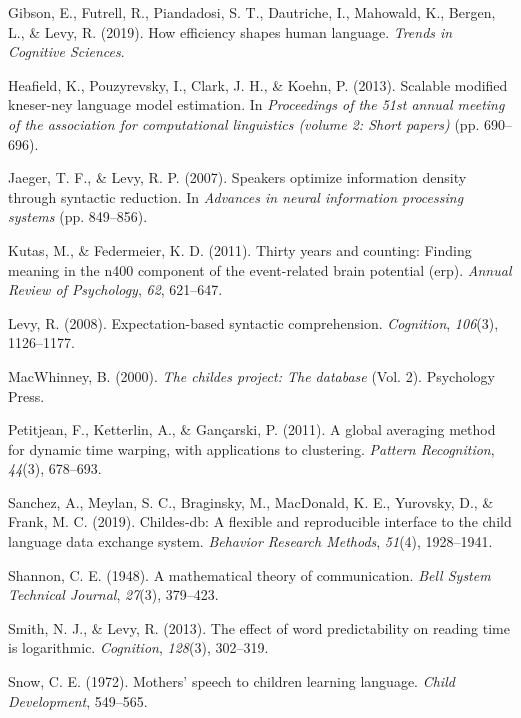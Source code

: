 \documentclass[10pt, letterpaper]{article}
\begin{document}
\leavevmode\hypertarget{ref-gibson2019}{}%
Gibson, E., Futrell, R., Piandadosi, S. T., Dautriche, I., Mahowald, K.,
Bergen, L., \& Levy, R. (2019). How efficiency shapes human language.
\emph{Trends in Cognitive Sciences}.

\leavevmode\hypertarget{ref-heafield2013}{}%
Heafield, K., Pouzyrevsky, I., Clark, J. H., \& Koehn, P. (2013).
Scalable modified kneser-ney language model estimation. In
\emph{Proceedings of the 51st annual meeting of the association for
computational linguistics (volume 2: Short papers)} (pp. 690--696).

\leavevmode\hypertarget{ref-jaeger2007}{}%
Jaeger, T. F., \& Levy, R. P. (2007). Speakers optimize information
density through syntactic reduction. In \emph{Advances in neural
information processing systems} (pp. 849--856).

\leavevmode\hypertarget{ref-kutas2011}{}%
Kutas, M., \& Federmeier, K. D. (2011). Thirty years and counting:
Finding meaning in the n400 component of the event-related brain
potential (erp). \emph{Annual Review of Psychology}, \emph{62},
621--647.

\leavevmode\hypertarget{ref-levy2008}{}%
Levy, R. (2008). Expectation-based syntactic comprehension.
\emph{Cognition}, \emph{106}(3), 1126--1177.

\leavevmode\hypertarget{ref-macwhinney2000}{}%
MacWhinney, B. (2000). \emph{The childes project: The database} (Vol.
2). Psychology Press.

\leavevmode\hypertarget{ref-petitjean2011}{}%
Petitjean, F., Ketterlin, A., \& Gançarski, P. (2011). A global
averaging method for dynamic time warping, with applications to
clustering. \emph{Pattern Recognition}, \emph{44}(3), 678--693.

\leavevmode\hypertarget{ref-sanchez2019}{}%
Sanchez, A., Meylan, S. C., Braginsky, M., MacDonald, K. E., Yurovsky,
D., \& Frank, M. C. (2019). Childes-db: A flexible and reproducible
interface to the child language data exchange system. \emph{Behavior
Research Methods}, \emph{51}(4), 1928--1941.

\leavevmode\hypertarget{ref-shannon1948}{}%
Shannon, C. E. (1948). A mathematical theory of communication.
\emph{Bell System Technical Journal}, \emph{27}(3), 379--423.

\leavevmode\hypertarget{ref-smith2013}{}%
Smith, N. J., \& Levy, R. (2013). The effect of word predictability on
reading time is logarithmic. \emph{Cognition}, \emph{128}(3), 302--319.

\leavevmode\hypertarget{ref-snow1972}{}%
Snow, C. E. (1972). Mothers' speech to children learning language.
\emph{Child Development}, 549--565.
\end{document}
